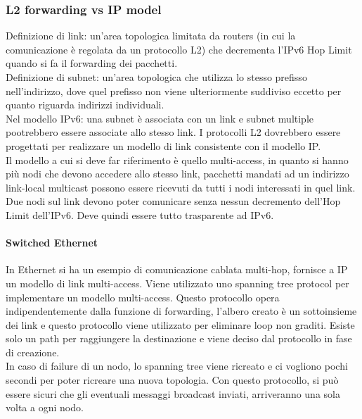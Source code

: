 \documentclass{article}
\begin{document}
\subsubsection{L2 forwarding vs IP model}
Definizione di link: un'area topologica limitata da routers (in cui la comunicazione è regolata da un protocollo L2) che decrementa l'IPv6 Hop Limit quando si fa il forwarding dei pacchetti. \\ Definizione di subnet: un'area topologica che utilizza lo stesso prefisso nell'indirizzo, dove quel prefisso non viene ulteriormente suddiviso eccetto per quanto riguarda indirizzi individuali. \\ Nel modello IPv6: una subnet è associata con un link e subnet multiple pootrebbero essere associate allo stesso link. I protocolli L2 dovrebbero essere progettati per realizzare un modello di link consistente con il modello IP. \\ Il modello a cui si deve far riferimento è quello multi-access, in quanto si hanno più nodi che devono accedere allo stesso link, pacchetti mandati ad un indirizzo link-local multicast possono essere ricevuti da tutti i nodi interessati in quel link. Due nodi sul link devono poter comunicare senza nessun decremento dell'Hop Limit dell'IPv6. Deve quindi essere tutto trasparente ad IPv6. 
\paragraph{Switched Ethernet}
In Ethernet si ha un esempio di comunicazione cablata multi-hop, fornisce a IP un modello di link multi-access. Viene utilizzato uno spanning tree protocol per implementare un modello multi-access. Questo protocollo opera indipendentemente dalla funzione di forwarding, l'albero creato è un sottoinsieme dei link e questo protocollo viene utilizzato per eliminare loop non graditi. Esiste solo un path per raggiungere la destinazione e viene deciso dal protocollo in fase di creazione. \\ In caso di failure di un nodo, lo spanning tree viene ricreato e ci vogliono pochi secondi per poter ricreare una nuova topologia. Con questo protocollo, si può essere sicuri che gli eventuali messaggi broadcast inviati, arriveranno una sola volta a ogni nodo.
\end{document}

